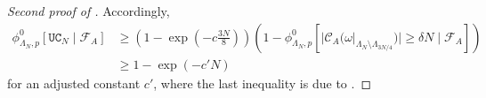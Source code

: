 \documentclass[article,11pt,reqno]{amsart}
\begin{document}
\begin{appendix}
\begin{proof}[Second proof of ]
Accordingly,
\begin{align*}
\phi^0_{\Lambda_N,p}[\mathtt{UC}_N\mid \mathcal{F}_A]&\geq \left(1-\exp\left(-c \frac{3N}{8}\right)\right) \left(1-\phi^0_{\Lambda_N,p}[|\mathscr{C}_A(\omega|_{\Lambda_N \setminus \Lambda_{3N/4}})|\geq \delta N\mid \mathcal{F}_A]\right)\\
&\geq 1-\exp(-c' N)
\end{align*}
for an adjusted constant $c'$, where the last inequality is due to . 
\end{proof}


\end{appendix}






\end{document}
